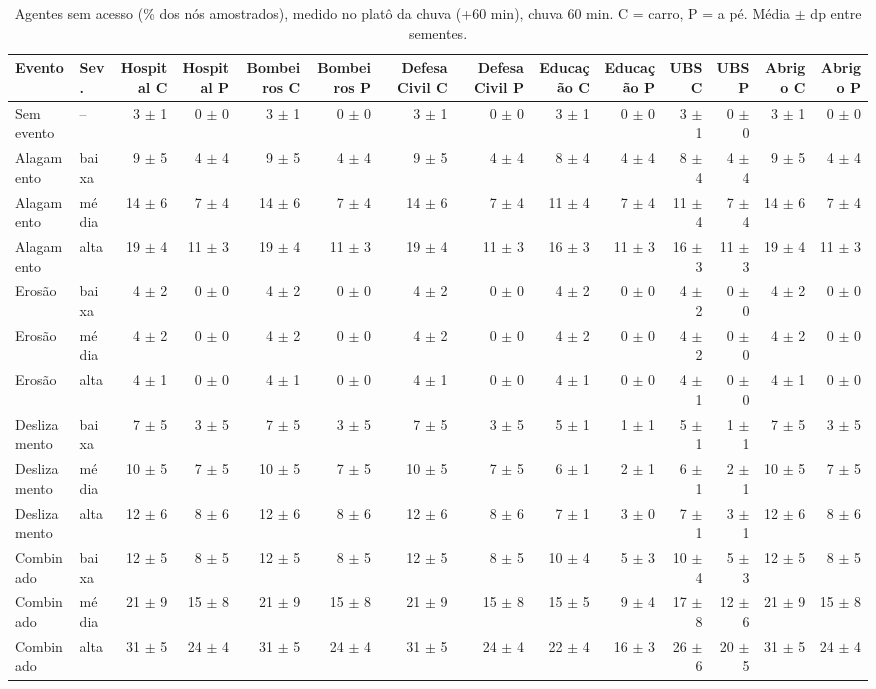 \begin{table}[htbp]
\centering
\tiny
\caption{Agentes sem acesso (\% dos nós amostrados), medido no platô da chuva (+60 min), chuva 60 min. C = carro, P = a pé. Média $\pm$ dp entre sementes.}
\label{tab:t4_plato_60}
\begin{tabular}{llrrrrrrrrrrrr}
\toprule
Evento & Sev. & Hospital C & Hospital P & Bombeiros C & Bombeiros P & Defesa Civil C & Defesa Civil P & Educação C & Educação P & UBS C & UBS P & Abrigo C & Abrigo P \\
\midrule
Sem evento & -- & 3 $\pm$ 1 & 0 $\pm$ 0 & 3 $\pm$ 1 & 0 $\pm$ 0 & 3 $\pm$ 1 & 0 $\pm$ 0 & 3 $\pm$ 1 & 0 $\pm$ 0 & 3 $\pm$ 1 & 0 $\pm$ 0 & 3 $\pm$ 1 & 0 $\pm$ 0 \\
Alagamento & baixa & 9 $\pm$ 5 & 4 $\pm$ 4 & 9 $\pm$ 5 & 4 $\pm$ 4 & 9 $\pm$ 5 & 4 $\pm$ 4 & 8 $\pm$ 4 & 4 $\pm$ 4 & 8 $\pm$ 4 & 4 $\pm$ 4 & 9 $\pm$ 5 & 4 $\pm$ 4 \\
Alagamento & média & 14 $\pm$ 6 & 7 $\pm$ 4 & 14 $\pm$ 6 & 7 $\pm$ 4 & 14 $\pm$ 6 & 7 $\pm$ 4 & 11 $\pm$ 4 & 7 $\pm$ 4 & 11 $\pm$ 4 & 7 $\pm$ 4 & 14 $\pm$ 6 & 7 $\pm$ 4 \\
Alagamento & alta & 19 $\pm$ 4 & 11 $\pm$ 3 & 19 $\pm$ 4 & 11 $\pm$ 3 & 19 $\pm$ 4 & 11 $\pm$ 3 & 16 $\pm$ 3 & 11 $\pm$ 3 & 16 $\pm$ 3 & 11 $\pm$ 3 & 19 $\pm$ 4 & 11 $\pm$ 3 \\
Erosão & baixa & 4 $\pm$ 2 & 0 $\pm$ 0 & 4 $\pm$ 2 & 0 $\pm$ 0 & 4 $\pm$ 2 & 0 $\pm$ 0 & 4 $\pm$ 2 & 0 $\pm$ 0 & 4 $\pm$ 2 & 0 $\pm$ 0 & 4 $\pm$ 2 & 0 $\pm$ 0 \\
Erosão & média & 4 $\pm$ 2 & 0 $\pm$ 0 & 4 $\pm$ 2 & 0 $\pm$ 0 & 4 $\pm$ 2 & 0 $\pm$ 0 & 4 $\pm$ 2 & 0 $\pm$ 0 & 4 $\pm$ 2 & 0 $\pm$ 0 & 4 $\pm$ 2 & 0 $\pm$ 0 \\
Erosão & alta & 4 $\pm$ 1 & 0 $\pm$ 0 & 4 $\pm$ 1 & 0 $\pm$ 0 & 4 $\pm$ 1 & 0 $\pm$ 0 & 4 $\pm$ 1 & 0 $\pm$ 0 & 4 $\pm$ 1 & 0 $\pm$ 0 & 4 $\pm$ 1 & 0 $\pm$ 0 \\
Deslizamento & baixa & 7 $\pm$ 5 & 3 $\pm$ 5 & 7 $\pm$ 5 & 3 $\pm$ 5 & 7 $\pm$ 5 & 3 $\pm$ 5 & 5 $\pm$ 1 & 1 $\pm$ 1 & 5 $\pm$ 1 & 1 $\pm$ 1 & 7 $\pm$ 5 & 3 $\pm$ 5 \\
Deslizamento & média & 10 $\pm$ 5 & 7 $\pm$ 5 & 10 $\pm$ 5 & 7 $\pm$ 5 & 10 $\pm$ 5 & 7 $\pm$ 5 & 6 $\pm$ 1 & 2 $\pm$ 1 & 6 $\pm$ 1 & 2 $\pm$ 1 & 10 $\pm$ 5 & 7 $\pm$ 5 \\
Deslizamento & alta & 12 $\pm$ 6 & 8 $\pm$ 6 & 12 $\pm$ 6 & 8 $\pm$ 6 & 12 $\pm$ 6 & 8 $\pm$ 6 & 7 $\pm$ 1 & 3 $\pm$ 0 & 7 $\pm$ 1 & 3 $\pm$ 1 & 12 $\pm$ 6 & 8 $\pm$ 6 \\
Combinado & baixa & 12 $\pm$ 5 & 8 $\pm$ 5 & 12 $\pm$ 5 & 8 $\pm$ 5 & 12 $\pm$ 5 & 8 $\pm$ 5 & 10 $\pm$ 4 & 5 $\pm$ 3 & 10 $\pm$ 4 & 5 $\pm$ 3 & 12 $\pm$ 5 & 8 $\pm$ 5 \\
Combinado & média & 21 $\pm$ 9 & 15 $\pm$ 8 & 21 $\pm$ 9 & 15 $\pm$ 8 & 21 $\pm$ 9 & 15 $\pm$ 8 & 15 $\pm$ 5 & 9 $\pm$ 4 & 17 $\pm$ 8 & 12 $\pm$ 6 & 21 $\pm$ 9 & 15 $\pm$ 8 \\
Combinado & alta & 31 $\pm$ 5 & 24 $\pm$ 4 & 31 $\pm$ 5 & 24 $\pm$ 4 & 31 $\pm$ 5 & 24 $\pm$ 4 & 22 $\pm$ 4 & 16 $\pm$ 3 & 26 $\pm$ 6 & 20 $\pm$ 5 & 31 $\pm$ 5 & 24 $\pm$ 4 \\
\bottomrule
\end{tabular}
\end{table}
